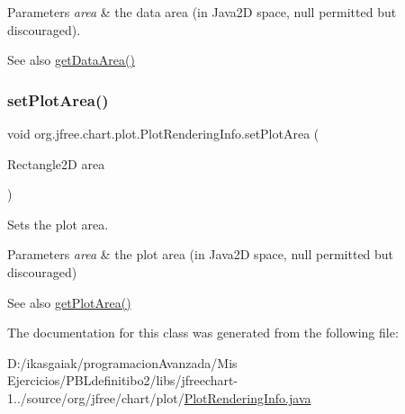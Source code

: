 \begin{DoxyParams}{Parameters}
{\em area} & the data area (in Java2D space, {\ttfamily null} permitted but discouraged).\\
\hline
\end{DoxyParams}
\begin{DoxySeeAlso}{See also}
\mbox{\hyperlink{classorg_1_1jfree_1_1chart_1_1plot_1_1_plot_rendering_info_a1dc9b2a8f70081daab3309ff46747dfd}{get\+Data\+Area()}} 
\end{DoxySeeAlso}
\mbox{\label{classorg_1_1jfree_1_1chart_1_1plot_1_1_plot_rendering_info_ade390a6d8612deaded6505d39cb2d0ac}} 
\subsubsection{\texorpdfstring{set\+Plot\+Area()}{setPlotArea()}}
{\footnotesize\ttfamily void org.\+jfree.\+chart.\+plot.\+Plot\+Rendering\+Info.\+set\+Plot\+Area (\begin{DoxyParamCaption}\item[{Rectangle2D}]{area }\end{DoxyParamCaption})}

Sets the plot area.


\begin{DoxyParams}{Parameters}
{\em area} & the plot area (in Java2D space, {\ttfamily null} permitted but discouraged)\\
\hline
\end{DoxyParams}
\begin{DoxySeeAlso}{See also}
\mbox{\hyperlink{classorg_1_1jfree_1_1chart_1_1plot_1_1_plot_rendering_info_aeba057ee7d70678df2f7f88314de2d69}{get\+Plot\+Area()}} 
\end{DoxySeeAlso}


The documentation for this class was generated from the following file\+:\begin{DoxyCompactItemize}
\item 
D\+:/ikasgaiak/programacion\+Avanzada/\+Mis Ejercicios/\+P\+B\+Ldefinitibo2/libs/jfreechart-\/1../source/org/jfree/chart/plot/\mbox{\hyperlink{_plot_rendering_info_8java}{Plot\+Rendering\+Info.\+java}}\end{DoxyCompactItemize}
